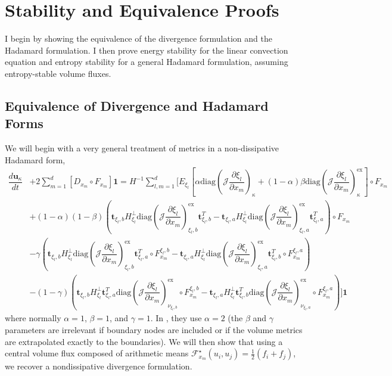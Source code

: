 \documentclass[12pt,a4paper]{article}
\newcommand{\pder}[2][]{\dfrac{\partial #1}{\partial #2}} %
\newcommand{\der}[2][]{\dfrac{d #1}{d #2}} %
\newcommand{\fn}[1]{\mathcal{#1}} %
\begin{document}
\newpage

\section{Stability and Equivalence Proofs}

I begin by showing the equivalence of the divergence formulation and the Hadamard formulation. I then prove energy stability for the linear convection equation and entropy stability for a general Hadamard formulation, assuming entropy-stable volume fluxes.

\subsection{Equivalence of Divergence and Hadamard Forms}

We will begin with a very general treatment of metrics in a non-dissipative Hadamard form,
\begin{align*}
\der[\bm{u}_\kappa]{t} &+ 2 \sum_{m=1}^d \left[ D_{x_m} \circ F_{x_m} \right] \bm{1}  
= H^{-1} \sum_{l,m=1}^d \Bigg[  E_{\xi_l} \left[ \alpha \text{diag}  \left( \fn{J} \pder[\xi_l]{x_m} \right)_{\kappa} + (1-\alpha) \beta \text{diag}  \left( \fn{J} \pder[\xi_l]{x_m} \right)_{\kappa}^\text{ex} \right] \circ  F_{x_m} \\
& + (1-\alpha) (1 - \beta)  \left(  \bm{t}_{\xi_l, b} H^{\bot}_{\xi_l}  \text{diag} \left( \fn{J} \pder[\xi_l]{x_m} \right)_{\xi_l, b}^\text{ex} \bm{t}_{\xi_l, b}^T -  \bm{t}_{\xi_l, a} H^{\bot}_{\xi_l}  \text{diag} \left( \fn{J} \pder[\xi_l]{x_m} \right)_{\xi_l , a}^\text{ex} \bm{t}_{\xi_l, a}^T \right)  \circ  F_{x_m} \\
& - \gamma \left( \bm{t}_{\xi_l, b} H^{\bot}_{\xi_l}  \text{diag} \left( \fn{J} \pder[\xi_l]{x_m} \right)_{\xi_l,b}^\text{ex} \bm{t}_{\xi_l, a}^T \circ F_{x_m}^{\xi_l , b} - \bm{t}_{\xi_l, a} H^{\bot}_{\xi_l} \text{diag} \left( \fn{J} \pder[\xi_l]{x_m} \right)_{\xi_l,a}^\text{ex} \bm{t}_{\xi_l, b}^T \circ F_{x_m}^{\xi_l , a} \right) \\
& - (1-\gamma) \left(  \bm{t}_{\xi_l, b} H^{\bot}_{\xi_l} \bm{t}_{\xi_l, a}^T \text{diag} \left( \fn{J} \pder[\xi_l]{x_m} \right)_{\nu_{\xi_l,b}}^\text{ex} \circ F_{x_m}^{\xi_l , b} -  \bm{t}_{\xi_l, a} H^{\bot}_{\xi_l} \bm{t}_{\xi_l, b}^T \text{diag} \left( \fn{J} \pder[\xi_l]{x_m} \right)_{\nu_{\xi_l,a}}^\text{ex} \circ F_{x_m}^{\xi_l , a} \right) \Bigg] \bm{1}
\end{align*}
where normally $\alpha = 1$, $\beta = 1$, and $\gamma=1$. In \cite{nolasco_optimized_2020}, they use $\alpha = 2$ (the $\beta$ and $\gamma$ parameters are irrelevant if boundary nodes are included or if the volume metrics are extrapolated exactly to the boundaries). We will then show that using a central volume flux composed of arithmetic means $ \fn{F}^\star_{x_m} (u_i, u_j) = \frac{1}{2}(f_i + f_j) $, we recover a nondissipative divergence formulation.
\end{document}
